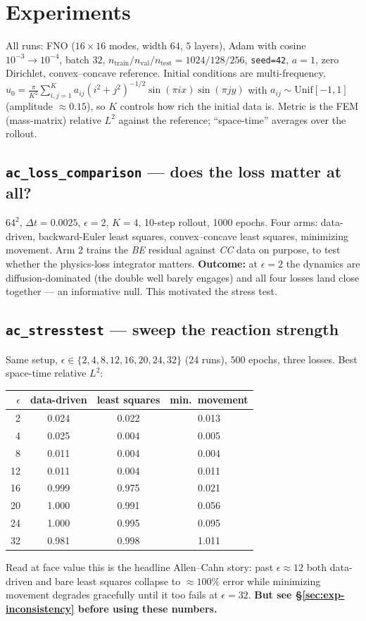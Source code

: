\documentclass[11pt]{article}
\newcommand{\dt}{\Delta t}
\begin{document}
\section{Experiments}

All runs: FNO ($16\times16$ modes, width $64$, $5$ layers), Adam with cosine
$10^{-3}\!\to\!10^{-4}$, batch $32$, $n_{\text{train}}/n_{\text{val}}/n_{\text{test}} =
1024/128/256$, \texttt{seed=42}, $a=1$, zero Dirichlet, convex--concave reference. Initial
conditions are multi-frequency,
$u_0 = \frac{\pi}{K^2}\sum_{i,j=1}^{K} a_{ij}(i^2+j^2)^{-1/2}\sin(\pi i x)\sin(\pi j y)$ with
$a_{ij}\sim\mathrm{Unif}[-1,1]$ (amplitude $\approx0.15$), so $K$ controls how rich the initial
data is. Metric is the FEM (mass-matrix) relative $L^2$ against the reference; ``space-time''
averages over the rollout.

\subsection{\texttt{ac\_loss\_comparison} --- does the loss matter at all?}
$64^2$, $\dt=0.0025$, $\epsilon=2$, $K=4$, 10-step rollout, 1000 epochs. Four arms: data-driven,
backward-Euler least squares, convex--concave least squares, minimizing movement. Arm 2 trains the
\emph{BE} residual against \emph{CC} data on purpose, to test whether the physics-loss integrator
matters. \textbf{Outcome:} at $\epsilon=2$ the dynamics are diffusion-dominated (the double well
barely engages) and all four losses land close together --- an informative null. This motivated the
stress test.

\subsection{\texttt{ac\_stresstest} --- sweep the reaction strength}
Same setup, $\epsilon\in\{2,4,8,12,16,20,24,32\}$ (24 runs), $500$ epochs, three losses. Best
space-time relative $L^2$:
\begin{center}
\begin{tabular}{rccc}
\hline
$\epsilon$ & data-driven & least squares & min.\ movement \\
\hline
 2 & 0.024 & 0.022 & 0.013 \\
 4 & 0.025 & 0.004 & 0.005 \\
 8 & 0.011 & 0.004 & 0.004 \\
12 & 0.011 & 0.004 & 0.011 \\
16 & 0.999 & 0.975 & 0.021 \\
20 & 1.000 & 0.991 & 0.056 \\
24 & 1.000 & 0.995 & 0.095 \\
32 & 0.981 & 0.998 & 1.011 \\
\hline
\end{tabular}
\end{center}
Read at face value this is the headline Allen--Cahn story: past $\epsilon\approx12$ both
data-driven and bare least squares collapse to $\approx100\%$ error while minimizing movement
degrades gracefully until it too fails at $\epsilon=32$. \textbf{But see
\S\ref{sec:exp-inconsistency} before using these numbers.}
\end{document}
